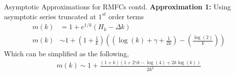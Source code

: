 \documentclass{beamer}
\begin{document}
\begin{frame}{Asymptotic Approximations for RMFCs contd.}
\textbf{Approximation 1:} Using asymptotic series truncated at $1^{st}$ order terms
\begin{align*}
    m(k)&=1+e^{1/k}\left( H_k - \Delta k \right)\\
    m(k) &\sim 1+\left( 1+ \frac{1}{k} \right) \left( \left( \log(k) + \gamma + \frac{1}{2k} \right) - \left( \frac{\log(2)}{k} \right) \right)
\end{align*}
Which can be simplified as the following,
\begin{align}
    m(k) \sim 1+ \frac{(1+k)(1+2 \gamma k - \log (4) +2k \log(k))}{2k^2}
\end{align}
    
\end{frame}
\end{document}
